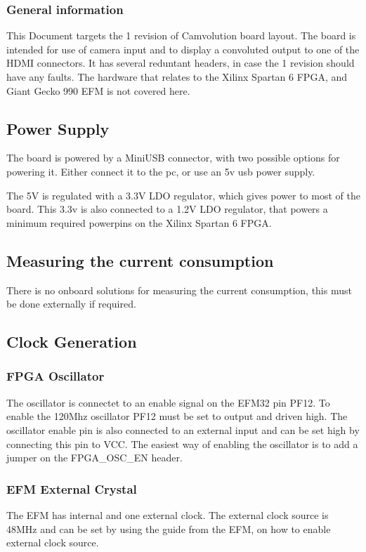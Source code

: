 \subsubsection{General information}
This Document targets the 1 revision of Camvolution board layout. The board is intended for use of camera input and to display a convoluted output to one of the HDMI connectors. It has several reduntant headers, in case the 1 revision should have any faults. The hardware that relates to the Xilinx Spartan 6 FPGA, and Giant Gecko 990 EFM is not covered here.

\subsection{Power Supply}
The board is powered by a MiniUSB connector, with two possible options for powering it. Either connect it to the pc, or use an 5v usb power supply.

The 5V is regulated with a 3.3V LDO regulator, which gives power to most of the board. This 3.3v is also connected to a 1.2V LDO regulator, that powers a minimum required powerpins on the Xilinx Spartan 6 FPGA. 

\subsection{Measuring the current consumption}
There is no onboard solutions for measuring the current consumption, this must be done externally if required. 

\subsection{Clock Generation}
\subsubsection{FPGA Oscillator}The oscillator is connectet to an enable signal on the EFM32 pin PF12. To enable the 120Mhz oscillator PF12 must be set to output and driven high. The oscillator enable pin is also connected to an external input and can be set high by connecting this pin to VCC. The easiest way of enabling the oscillator is to add a jumper on the FPGA\_OSC\_EN header.
\newline
\subsubsection{EFM External Crystal}
The EFM has internal and one external clock. The external clock source is 48MHz and can be set by using the guide from the EFM, on how to enable external clock source. 

